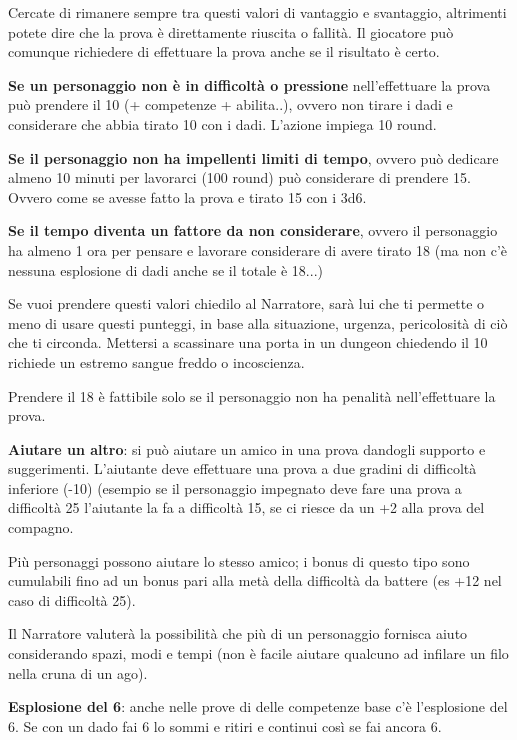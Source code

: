 \documentclass[a4paper,11pt,twoside,openany]{book}
\begin{document}
Cercate di rimanere sempre tra questi valori di vantaggio e svantaggio, altrimenti potete dire che la prova è direttamente riuscita o fallità.
Il giocatore può comunque richiedere di effettuare la prova anche se il risultato è certo.

\textbf{Se un personaggio non è in difficoltà o pressione} nell'effettuare la prova può prendere il 10 (+ competenze + abilita..), ovvero non tirare i dadi e considerare che abbia tirato 10 con i dadi. L'azione impiega 10 round.

\textbf{Se il personaggio non ha impellenti limiti di tempo}, ovvero può dedicare almeno 10 minuti per lavorarci (100 round) può considerare di prendere 15. Ovvero come se avesse fatto la prova e tirato 15 con i 3d6.

\textbf{Se il tempo diventa un fattore da non considerare}, ovvero il personaggio ha almeno 1 ora per pensare e lavorare considerare di avere tirato 18 (ma non c'è nessuna esplosione di dadi anche se il totale è 18...)

Se vuoi prendere questi valori chiedilo al Narratore, sarà lui che ti permette o meno di usare questi punteggi, in base alla situazione, urgenza, pericolosità di ciò che ti circonda. Mettersi a scassinare una porta in un dungeon chiedendo il 10 richiede un estremo sangue freddo o incoscienza.


Prendere il 18 è fattibile solo se il personaggio non ha penalità nell'effettuare la prova.

\textbf{Aiutare un altro}: si può aiutare un amico in una prova dandogli supporto e suggerimenti. L'aiutante deve effettuare una prova a due gradini di difficoltà inferiore (-10) (esempio se il personaggio impegnato deve fare una prova a difficoltà 25 l'aiutante la fa a difficoltà 15, se ci riesce da un +2 alla prova del compagno.


Più personaggi possono aiutare lo stesso amico; i bonus di questo tipo sono cumulabili fino ad un bonus pari alla metà della difficoltà da battere (es +12 nel caso di difficoltà 25).

Il Narratore valuterà la possibilità che più di un personaggio fornisca aiuto considerando spazi, modi e tempi (non è facile aiutare qualcuno ad infilare un filo nella cruna di un ago).

\textbf{Esplosione del 6}: anche nelle prove di delle competenze base c'è l'esplosione del 6. Se con un dado fai 6 lo sommi e ritiri e continui così se fai ancora 6.
\end{document}
